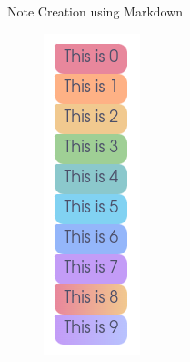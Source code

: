\documentclass[10pt, xcolor=dvipsnames]{beamer}
\begin{document}
\begin{frame}{Note Creation using Markdown}
\begin{figure}
\begin{minipage}{.32\textwidth}
		\end{minipage}%
		\begin{minipage}{.32\textwidth}
			\centering
			\includegraphics[width=.7\linewidth]{../latex-image/markdown2}

\end{minipage}
\end{figure}
\end{frame}
\end{document}
